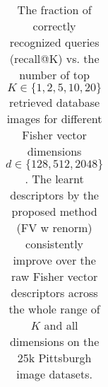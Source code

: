 \begin{table}[t!]
\begin{centering}
\begin{tabularx}{0.89\linewidth}{|l|c c c c c|}
	\end{tabularx}
	\caption{ \textcolor{myRed}{}
The fraction of correctly recognized queries (recall@K) vs. the number of top $K\in\{1,2,5,10,20\}$ retrieved database images for different Fisher vector dimensions $d\in\{128,512,2048\}$. The learnt descriptors by the proposed method (FV w renorm) consistently improve over the raw Fisher vector descriptors across the whole range of $K$ and all dimensions on the 25k Pittsburgh image datasets.		
}
\label{tab:recall01}
\end{centering}
\end{table}
